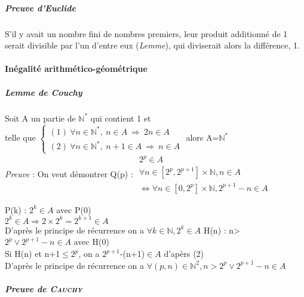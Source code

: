 \subparagraph{Preuve d'Euclide}

S'il y avait un nombre fini de nombres premiers, leur produit additionné de 1 serait divisible par l'un d'entre eux (\textsl{Lemme}), qui diviserait alors la différence, 1.

\paragraph{Inégalité arithmético-géométrique}

\subparagraph{Lemme de Couchy}

Soit A un partie de $\mathbb{N} ^*$ qui contient 1 et \\telle que
$\left\{
\begin{array}{l}
(1) ~\forall n\in\mathbb{N} ^*,~n\in A~\Rightarrow ~2n\in A \\
(2) ~\forall n\in\mathbb{N} ^*,~n+1\in A~\Rightarrow ~n\in A
\end{array}
\right.$
alors A=$\mathbb{N} ^*$
\\\textsl{Preuve} : On veut démontrer Q(p) : $\begin{array}{l}
2^p\in A \\
\forall n\in [2^p, 2^{p+1}]\times\mathbb{N} , n\in A\\
\Leftrightarrow \forall n\in [0, 2^p]\times\mathbb{N} , 2^{p+1}-n\in A
\end{array}$
\begin{multicols}{2}
P(k) : $2^k\in A$  avec P(0)
\\$2^k\in A \Rightarrow 2\times 2^k=2^{k+1}\in A$
\\D'après le principe de récurrence on a $\forall k\in\mathbb{N} , 2^k\in A$
\columnbreak
H(n) : n>$2^p\vee 2^{p+1}-n\in A$ avec H(0)
\\Si H(n) et n+1$\leq 2^p$, on a $2^{p+1}$-(n+1)$\in A$ d'apèrs (2)
\\D'après le principe de récurrence on a $\forall (p,n)\in\mathbb{N} ^2, n>2^p\vee 2^{p+1}-n\in A$
\end{multicols}

\subparagraph{Preuve de \textsc{Cauchy}}

